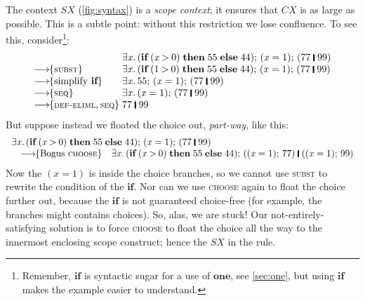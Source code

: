 \documentclass[acmsmall,review,dvipsnames]{acmart}
\newcommand{\Conid}[1]{\mathit{#1}}
\newcommand{\Varid}[1]{\mathit{#1}}
\newcommand{\rulename}[1]{\textsc{\small #1}}
\newcommand{\movesto}{\longrightarrow}
\newcommand{\movestoC}[1]{\movesto\!\!\{#1\}}
\newcommand{\movestoR}[1]{\movestoC{\rulename{#1}}}
\newcommand{\movestoRR}[2]{\movestoC{\rulename{#1}, \rulename{#2}}}
\begin{document}
The context \ensuremath{\Conid{SX}} (\cref{fig:syntax}) is a \emph{scope context}; it
ensures that \ensuremath{CX} is as large as possible.  This is a subtle point:
without this restriction we lose confluence.  To see this, consider\footnote{Remember, \ensuremath{\textbf{if}} is syntactic sugar for
  a use of \ensuremath{\textbf{one}}, see \cref{sec:one}, but using \ensuremath{\textbf{if}} makes the example easier to understand.}:
$$
\begin{array}{l@{\;}l}
                                 & \ensuremath{\exists\Varid{x}.\,(\textbf{if}\;(\Varid{x}\mathbin{>}\mathrm{0})\;\textbf{then}\;\mathrm{55}\;\textbf{else}\;\mathrm{44});\,(\Varid{x}\mathrel{=}\mathrm{1});\,(\mathrm{77}\;\rule[-0.3mm]{0.5mm}{2.5mm}\;\mathrm{99})}\\
 \movestoR{subst}                & \ensuremath{\exists\Varid{x}.\,(\textbf{if}\;(\mathrm{1}\mathbin{>}\mathrm{0})\;\textbf{then}\;\mathrm{55}\;\textbf{else}\;\mathrm{44});\,(\Varid{x}\mathrel{=}\mathrm{1});\,(\mathrm{77}\;\rule[-0.3mm]{0.5mm}{2.5mm}\;\mathrm{99})}\\
 \movestoC{\text{simplify \ensuremath{\textbf{if}}}} & \ensuremath{\exists\Varid{x}.\,\mathrm{55};\,(\Varid{x}\mathrel{=}\mathrm{1});\,(\mathrm{77}\;\rule[-0.3mm]{0.5mm}{2.5mm}\;\mathrm{99})}\\
 \movestoR{seq}                  & \ensuremath{\exists\Varid{x}.\,(\Varid{x}\mathrel{=}\mathrm{1});\,(\mathrm{77}\;\rule[-0.3mm]{0.5mm}{2.5mm}\;\mathrm{99})}\\
 \movestoRR{def-eliml}{seq}      & \ensuremath{\mathrm{77}\;\rule[-0.3mm]{0.5mm}{2.5mm}\;\mathrm{99}}\\
\end{array}
$$
But suppose instead we floated the choice out, \emph{part-way}, like this:
$$
\begin{array}{ll}
\multicolumn{2}{l}{\ensuremath{\exists\Varid{x}.\,(\textbf{if}\;(\Varid{x}\mathbin{>}\mathrm{0})\;\textbf{then}\;\mathrm{55}\;\textbf{else}\;\mathrm{44});\,(\Varid{x}\mathrel{=}\mathrm{1});\,(\mathrm{77}\;\rule[-0.3mm]{0.5mm}{2.5mm}\;\mathrm{99})}}\\
\quad \movestoC{\text{Bogus \rulename{choose}}} & \ensuremath{\exists\Varid{x}.\,(\textbf{if}\;(\Varid{x}\mathbin{>}\mathrm{0})\;\textbf{then}\;\mathrm{55}\;\textbf{else}\;\mathrm{44});\,((\Varid{x}\mathrel{=}\mathrm{1});\,\mathrm{77})\;\rule[-0.3mm]{0.5mm}{2.5mm}\;((\Varid{x}\mathrel{=}\mathrm{1});\,\mathrm{99})}\\
\end{array}
$$
Now the \ensuremath{(\Varid{x}\mathrel{=}\mathrm{1})} is inside the choice branches, so we cannot use \rulename{subst} to rewrite the
condition of the \ensuremath{\textbf{if}}.  Nor can we use \rulename{choose} again to float the choice further out,
because the \ensuremath{\textbf{if}} is not guaranteed choice-free (for example, the branches might contains choices).
So, alas, we are stuck!
Our not-entirely-satisfying solution is to force \rulename{choose} to float the choice all the way
to the innermost enclosing scope construct; hence the \ensuremath{\Conid{SX}} in the rule.
\end{document}

